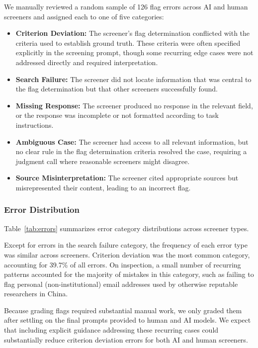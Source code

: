 \documentclass[utf8]{FrontiersinHarvard}
\begin{document}
We manually reviewed a random sample of 126 flag errors across AI and human screeners and assigned each to one of five categories:

\begin{itemize}
\item \textbf{Criterion Deviation:} The screener's flag determination conflicted with the criteria used to establish ground truth. These criteria were often specified explicitly in the screening prompt, though some recurring edge cases were not addressed directly and required interpretation.
\item \textbf{Search Failure:} The screener did not locate information that was central to the flag determination but that other screeners successfully found.
\item \textbf{Missing Response:} The screener produced no response in the relevant field, or the response was incomplete or not formatted according to task instructions.
\item \textbf{Ambiguous Case:} The screener had access to all relevant information, but no clear rule in the flag determination criteria resolved the case, requiring a judgment call where reasonable screeners might disagree.
\item \textbf{Source Misinterpretation:} The screener cited appropriate sources but misrepresented their content, leading to an incorrect flag.
\end{itemize}

\subsubsection{Error Distribution}

Table~\ref{tab:errors} summarizes error category distributions across screener types.

Except for errors in the search failure category, the frequency of each error type was similar across screeners. Criterion deviation was the most common category, accounting for 39.7\% of all errors. On inspection, a small number of recurring patterns accounted for the majority of mistakes in this category, such as failing to flag personal (non-institutional) email addresses used by otherwise reputable researchers in China.

Because grading flags required substantial manual work, we only graded them after settling on the final prompts provided to human and AI models. We expect that including explicit guidance addressing these recurring cases could substantially reduce criterion deviation errors for both AI and human screeners.
\end{document}
